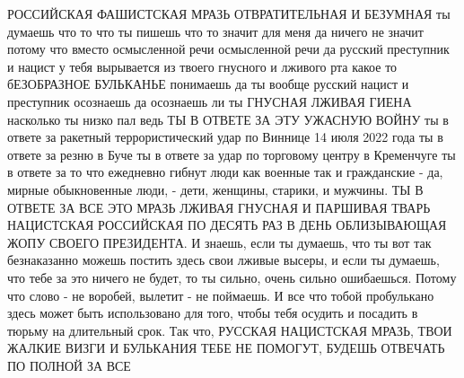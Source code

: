 
 
 
 
 

РОССИЙСКАЯ ФАШИСТСКАЯ МРАЗЬ ОТВРАТИТЕЛЬНАЯ И БЕЗУМНАЯ ты думаешь что то что ты
пишешь что то значит для меня да ничего не значит потому что вместо осмысленной
речи осмысленной речи да русский преступник и нацист у тебя вырывается из
твоего гнусного и лживого рта какое то бЕЗОБРАЗНОЕ БУЛЬКАНЬЕ понимаешь да ты
вообще русский нацист и преступник осознаешь да осознаешь ли ты ГНУСНАЯ ЛЖИВАЯ
ГИЕНА насколько ты низко пал ведь ТЫ В ОТВЕТЕ ЗА ЭТУ УЖАСНУЮ ВОЙНУ ты в ответе
за ракетный террористический удар по Виннице 14 июля 2022 года ты в ответе за
резню в Буче ты в ответе за удар по торговому центру в Кременчуге ты в ответе
за то что ежедневно гибнут люди как военные так и гражданские - да, мирные
обыкновенные люди, - дети, женщины, старики, и мужчины. ТЫ В ОТВЕТЕ ЗА ВСЕ ЭТО
МРАЗЬ ЛЖИВАЯ ГНУСНАЯ И ПАРШИВАЯ ТВАРЬ НАЦИСТСКАЯ РОССИЙСКАЯ ПО ДЕСЯТЬ РАЗ В
ДЕНЬ ОБЛИЗЫВАЮЩАЯ ЖОПУ СВОЕГО ПРЕЗИДЕНТА. И знаешь, если ты думаешь, что ты вот
так безнаказанно можешь постить здесь свои лживые высеры, и если ты думаешь,
что тебе за это ничего не будет, то ты сильно, очень сильно ошибаешься. Потому
что слово - не воробей, вылетит - не поймаешь. И все что тобой пробулькано
здесь может быть использовано для того, чтобы тебя осудить и посадить в тюрьму
на длительный срок. Так что, РУССКАЯ НАЦИСТСКАЯ МРАЗЬ, ТВОИ ЖАЛКИЕ ВИЗГИ И
БУЛЬКАНИЯ ТЕБЕ НЕ ПОМОГУТ, БУДЕШЬ ОТВЕЧАТЬ ПО ПОЛНОЙ ЗА ВСЕ



